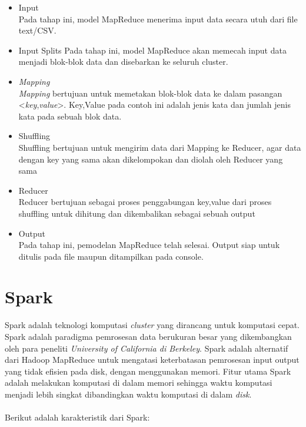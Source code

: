 \begin{itemize}
\item Input\\
Pada tahap ini, model MapReduce menerima input data secara utuh dari file text/CSV.

\item Input Splits
Pada tahap ini, model MapReduce akan memecah input data menjadi blok-blok data dan disebarkan ke seluruh cluster.

\item \textit{Mapping}\\
\textit{Mapping} bertujuan untuk memetakan blok-blok data ke dalam pasangan <\textit{key},\textit{value}>. Key,Value pada contoh ini adalah jenis kata dan jumlah jenis kata pada sebuah blok data.

\item Shuffling\\
Shuffling bertujuan untuk mengirim data dari Mapping ke Reducer, agar data dengan key yang sama akan dikelompokan dan diolah oleh Reducer yang sama

\item Reducer \\
Reducer bertujuan sebagai proses penggabungan key,value dari proses shuffling untuk dihitung dan dikembalikan sebagai sebuah output

\item Output\\
Pada tahap ini, pemodelan MapReduce telah selesai. Output siap untuk ditulis pada file maupun ditampilkan pada console.

\end{itemize}

\newpage
\section{Spark} 
\label{sec:konsep_spark}
Spark adalah teknologi komputasi \textit{cluster} yang dirancang untuk komputasi cepat. Spark adalah paradigma pemrosesan data berukuran besar yang dikembangkan oleh para peneliti \textit{University of California di Berkeley}. Spark adalah alternatif dari Hadoop MapReduce untuk mengatasi keterbatasan pemrosesan input output yang tidak efisien pada disk, dengan menggunakan memori. Fitur utama Spark adalah melakukan komputasi di dalam memori sehingga waktu komputasi menjadi lebih singkat dibandingkan waktu komputasi di dalam \textit{disk}.
\\\\
Berikut adalah karakteristik dari Spark:


